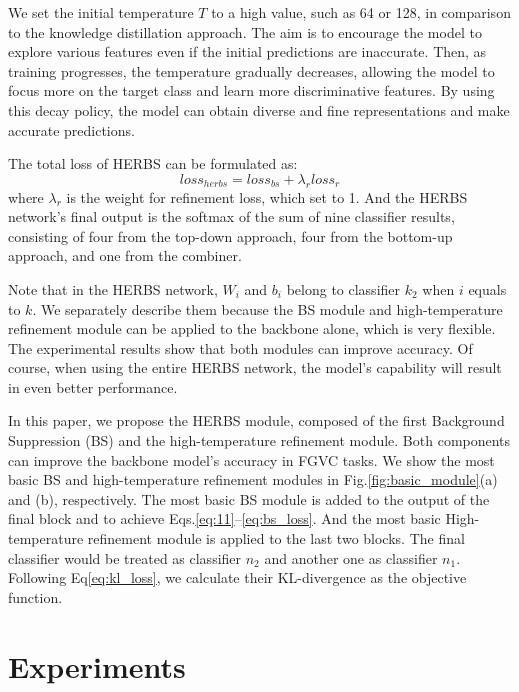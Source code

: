 \documentclass[journal]{IEEEtran}
\begin{document}
We set the initial temperature $T$ to a high value, such as 64 or 128, in comparison to the knowledge distillation approach\cite{KD}. The aim is to encourage the model to explore various features even if the initial predictions are inaccurate. Then, as training progresses, the temperature gradually decreases, allowing the model to focus more on the target class and learn more discriminative features. By using this decay policy, the model can obtain diverse and fine representations and make accurate predictions.

The total loss of HERBS can be formulated as:
\begin{equation} \label{eq:herbs_loss}
loss_{herbs} = loss_{bs} + \lambda_{r}loss_{r}
\end{equation}
where $\lambda_{r}$ is the weight for refinement loss, which set to 1. And the HERBS network's final output is the softmax of the sum of nine classifier results, consisting of four from the top-down approach, four from the bottom-up approach, and one from the combiner.

Note that in the HERBS network, $W_{i}$ and $b_{i}$ belong to classifier $k_{2}$ when $i$ equals to $k$. We separately describe them because the BS module and high-temperature refinement module can be applied to the backbone alone, which is very flexible. The experimental results show that both modules can improve accuracy. Of course, when using the entire HERBS network, the model's capability will result in even better performance.

In this paper, we propose the HERBS module, composed of the first Background Suppression (BS) and the high-temperature refinement module. Both components can improve the backbone model's accuracy in FGVC tasks. We show the most basic BS and high-temperature refinement modules in Fig.\ref{fig:basic_module}(a) and (b), respectively. The most basic BS module is added to the output of the final block and to achieve Eqs.\eqref{eq:11}--\eqref{eq:bs_loss}. And the most basic High-temperature refinement module is applied to the last two blocks. The final classifier would be treated as classifier $n_{2}$ and another one as classifier $n_{1}$. Following Eq\ref{eq:kl_loss}, we calculate their KL-divergence as the objective function.

\section{Experiments}
\end{document}
